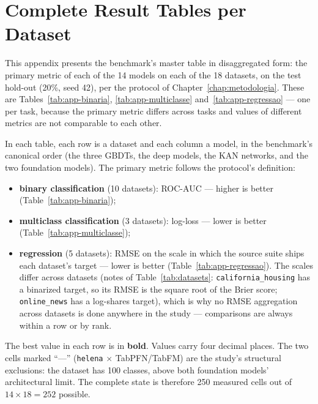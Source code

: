 \chapter{Complete Result Tables per Dataset}
\label{app:tabelas}

This appendix presents the benchmark's master table in disaggregated
form: the primary metric of each of the 14 models on each of the 18
datasets, on the test hold-out (20\%, seed 42), per the protocol of
Chapter~\ref{chap:metodologia}. These are
Tables~\ref{tab:app-binaria}, \ref{tab:app-multiclasse}
and~\ref{tab:app-regressao} --- one per task, because the primary
metric differs across tasks and values of different metrics are not
comparable to each other.

In each table, each row is a dataset and each column a model, in the
benchmark's canonical order (the three GBDTs, the deep models, the
KAN networks, and the two foundation models). The primary metric
follows the protocol's definition:
\begin{itemize}
  \item \textbf{binary classification} (10 datasets): ROC-AUC ---
    higher is better (Table~\ref{tab:app-binaria});
  \item \textbf{multiclass classification} (3 datasets): log-loss ---
    lower is better (Table~\ref{tab:app-multiclasse});
  \item \textbf{regression} (5 datasets): RMSE on the scale in which
    the source suite ships each dataset's target --- lower is better
    (Table~\ref{tab:app-regressao}). The scales differ across
    datasets (notes of Table~\ref{tab:datasets}:
    \texttt{california\_\allowbreak housing} has a binarized target,
    so its RMSE is the square root of the Brier score;
    \texttt{online\_news} has a log-shares target), which is why no
    RMSE aggregation across datasets is done anywhere in the study
    --- comparisons are always within a row or by rank.
\end{itemize}
The best value in each row is in \textbf{bold}. Values carry four
decimal places. The two cells marked ``---'' (\texttt{helena}
$\times$ TabPFN/TabFM) are the study's structural exclusions: the
dataset has 100 classes, above both foundation models' architectural
limit. The complete state is therefore 250 measured cells out of
$14 \times 18 = 252$ possible.

